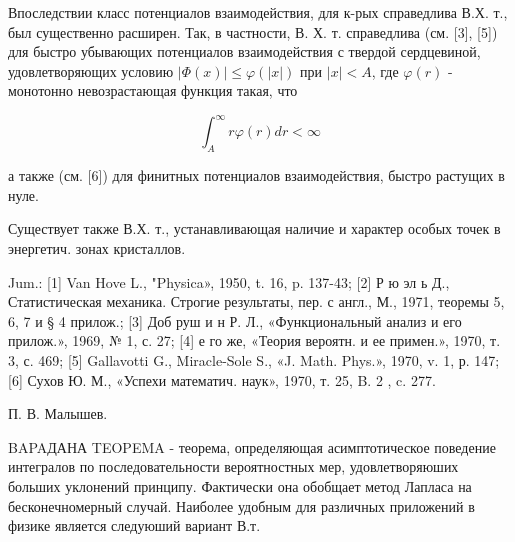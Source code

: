 \documentclass[10pt]{article}
\begin{document}
Впоследствии класс потенциалов взаимодействия, для к-рых справедлива В.Х. т., был существенно расширен. Так, в частности, В. Х. т. справедлива (см. [3], [5]) для быстро убывающих потенциалов взаимодействия с твердой сердцевиной, удовлетворяющих условию $|\Phi(x)| \leqslant \varphi(|x|)$ при $|x|<A$, где $\varphi(r)$ - монотонно невозрастающая функция такая, что



\[

\int_{A}^{\infty} r \varphi(r) d r<\infty

\]



а также (см. [6]) для финитных потенциалов взаимодействия, быстро растущих в нуле.



Существует также В.Х. т., устанавливающая наличие и характер особых точек в энергетич. зонах кристаллов.



Jum.: [1] Van Hove L., "Physica», 1950, t. 16, p. 137-43; [2] Р ю эл ь Д., Статистическая механика. Строгие результаты, пер. с англ., М., 1971, теоремы 5, 6, 7 и § 4 прилож.; [3] Доб руш и н Р. Л., «Функциональный анализ и его прилож.», 1969, № 1, с. 27; [4] е го же, «Теория вероятн. и ее примен.», 1970, т. 3, с. 469; [5] Gallavotti G., Miracle-Sole S., «J. Math. Phys.», 1970, v. 1, р. 147; [6] Сухов Ю. М., «Успехи математич. наук», 1970, т. 25, B. 2 , c. 277.



П. В. Малышев.



BAPAДАНА TEOPEMA - теорема, определяющая асимптотическое поведение интегралов по последовательности вероятностных мер, удовлетворяюших больших уклонений принципу. Фактически она обобщает метод Лапласа на бесконечномерный случай. Наиболее удобным для различных приложений в физике является следуюший вариант В.т.
\end{document}
